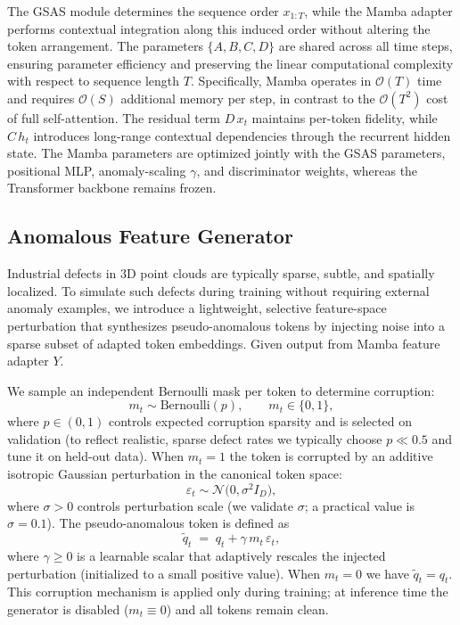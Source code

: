 The GSAS module determines the sequence order $x_{1:T}$, while the Mamba adapter performs contextual integration along this induced order without altering the token arrangement. The parameters $\{A,B,C,D\}$ are shared across all time steps, ensuring parameter efficiency and preserving the linear computational complexity with respect to sequence length $T$. Specifically, Mamba operates in $\mathcal{O}(T)$ time and requires $\mathcal{O}(S)$ additional memory per step, in contrast to the $\mathcal{O}(T^2)$ cost of full self-attention. The residual term $D\,x_t$ maintains per-token fidelity, while $C\,h_t$ introduces long-range contextual dependencies through the recurrent hidden state. The Mamba parameters are optimized jointly with the GSAS parameters, positional MLP, anomaly-scaling $\gamma$, and discriminator weights, whereas the Transformer backbone remains frozen.

\subsection{Anomalous Feature Generator}
Industrial defects in 3D point clouds are typically sparse, subtle, and spatially localized. To simulate such defects during training without requiring external anomaly examples, we introduce a lightweight, selective feature-space perturbation that synthesizes pseudo-anomalous tokens by injecting noise into a sparse subset of adapted token embeddings. Given output from Mamba feature adapter $Y$.

We sample an independent Bernoulli mask per token to determine corruption:
\begin{equation}
m_t \sim \mathrm{Bernoulli}(p),\qquad m_t\in\{0,1\},
\end{equation}
where \(p\in(0,1)\) controls expected corruption sparsity and is selected on validation (to reflect realistic, sparse defect rates we typically choose \(p\ll 0.5\) and tune it on held-out data). When \(m_t=1\) the token is corrupted by an additive isotropic Gaussian perturbation in the canonical token space:
\begin{equation}
\varepsilon_t \sim \mathcal{N}\big(0,\sigma^2 I_D\big),
\end{equation}
where \(\sigma>0\) controls perturbation scale (we validate \(\sigma\); a practical value is \(\sigma=0.1\)). The pseudo-anomalous token is defined as
\begin{equation}
\tilde{q}_t \;=\; q_t + \gamma\, m_t\, \varepsilon_t,
\end{equation}
where \(\gamma\ge 0\) is a learnable scalar that adaptively rescales the injected perturbation (initialized to a small positive value). When \(m_t=0\) we have \(\tilde{q}_t=q_t\). This corruption mechanism is applied only during training; at inference time the generator is disabled (\(m_t\equiv 0\)) and all tokens remain clean.


